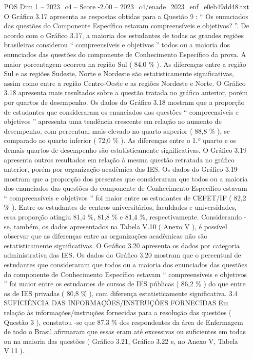 \begin{textsample}{POS Dim 1 – 2023\_c4 – Score -2.00 – 2023\_c4/enade\_2023\_enf\_e0eb49dd48.txt}
O Gráfico 3.17 apresenta as respostas obtidas para a Questão 9 : “ Os enunciados das questões do Componente Específico estavam compreensíveis e objetivos? ”.
De acordo com o Gráfico 3.17, a maioria dos estudantes de todas as grandes regiões brasileiras considerou “ compreensíveis e objetivos ” todos ou a maioria dos enunciados das questões do componente de Conhecimento Específico da prova.
A maior porcentagem ocorreu na região Sul ( 84,0 \% ).
As diferenças entre a região Sul e as regiões Sudeste, Norte e Nordeste são estatisticamente significativas, assim como entre a região Centro-Oeste e as regiões Nordeste e Norte.
O Gráfico 3.18 apresenta mais resultados sobre a questão tratada no gráfico anterior, porém por quartos de desempenho.
Os dados do Gráfico 3.18 mostram que a proporção de estudantes que consideraram os enunciados das questões “ compreensíveis e objetivos ” apresenta uma tendência crescente em relação ao aumento de desempenho, com percentual mais elevado no quarto superior ( 88,8 \% ), se comparado ao quarto inferior ( 72,0 \% ).
As diferenças entre o 1.º quarto e os demais quartos de desempenho são estatisticamente significativas.
O Gráfico 3.19 apresenta outros resultados em relação à mesma questão retratada no gráfico anterior, porém por organização acadêmica das IES.
Os dados do Gráfico 3.19 mostram que a proporção dos presentes que consideraram que todos ou a maioria dos enunciados das questões do componente de Conhecimento Específico estavam “ compreensíveis e objetivos ” foi maior entre os estudantes de CEFET/IF ( 82,2 \% ).
Entre os estudantes de centros universitários, faculdades e universidades, essa proporção atingiu 81,4 \%, 81,8 \% e 81,4 \%, respectivamente.
Considerando -se, também, os dados apresentados na Tabela V.10 ( Anexo V ), é possível observar que as diferenças entre as organizações acadêmicas não são estatisticamente significativas.
O Gráfico 3.20 apresenta os dados por categoria administrativa das IES.
Os dados do Gráfico 3.20 mostram que o percentual de estudantes que consideraram que todos ou a maioria dos enunciados das questões do componente de Conhecimento Específico estavam “ compreensíveis e objetivos ” foi maior entre os estudantes de cursos de IES públicas ( 86,2 \% ) do que entre os de IES privadas ( 80,8 \% ), com diferença estatisticamente significativa. 3.4 SUFICIÊNCIA DAS INFORMAÇÕES/INSTRUÇÕES FORNECIDAS Em relação às informações/instruções fornecidas para a resolução das questões ( Questão 3 ), constatou -se que 87,3 \% dos respondentes da área de Enfermagem de todo o Brasil afirmaram que essas eram até excessivas ou suficientes em todas ou na maioria das questões ( Gráfico 3.21, Gráfico 3.22 e, no Anexo V, Tabela V.11 ).

\end{textsample}
